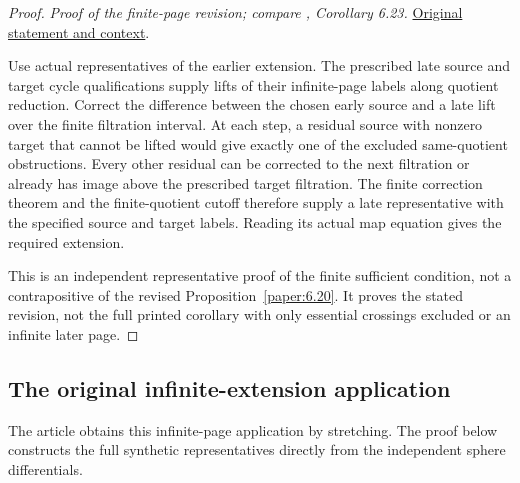 \begin{proof}
\textit{Proof of the finite-page revision; compare \cite{LWX126}, Corollary 6.23.} \href{paper/main.tex.html#L2074}{Original statement and context}.

Use actual representatives of the earlier extension. The prescribed late source and target cycle qualifications supply lifts of their infinite-page labels along quotient reduction. Correct the difference between the chosen early source and a late lift over the finite filtration interval. At each step, a residual source with nonzero target that cannot be lifted would give exactly one of the excluded same-quotient obstructions. Every other residual can be corrected to the next filtration or already has image above the prescribed target filtration. The finite correction theorem and the finite-quotient cutoff therefore supply a late representative with the specified source and target labels. Reading its actual map equation gives the required extension.

This is an independent representative proof of the finite sufficient condition, not a contrapositive of the revised Proposition~\ref{paper:6.20}. It proves the stated revision, not the full printed corollary with only essential crossings excluded or an infinite later page.
\end{proof}

\subsection{The original infinite-extension application}

The article obtains this infinite-page application by stretching.
The proof below constructs the full synthetic representatives directly
from the independent sphere differentials.

